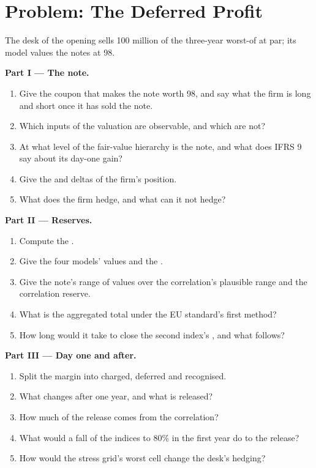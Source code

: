 \section{Problem: The Deferred Profit}

\begin{problem}\label{pb:dv:managing-an-exotic-book:1}
The desk of the opening sells 100 million of the three-year worst-of  at par; its model values the notes at 98.

\medskip\noindent\textbf{Part I --- The note.}
\begin{enumerate}
\item Give the coupon that makes the note worth 98, and say what the firm is long and short once it has sold the note.
\item Which inputs of the valuation are observable, and which are not?
\item At what level of the fair-value hierarchy is the note, and what does IFRS 9 say about its day-one gain?
\item Give the  and deltas of the firm's position.
\item What does the firm hedge, and what can it not hedge?
\end{enumerate}

\medskip\noindent\textbf{Part II --- Reserves.}
\begin{enumerate}[resume]
\item Compute the .
\item Give the four models' values and the .
\item Give the note's range of values over the correlation's plausible range and the correlation reserve.
\item What is the aggregated total under the EU standard's first method?
\item How long would it take to close the second index's , and what follows?
\end{enumerate}

\medskip\noindent\textbf{Part III --- Day one and after.}
\begin{enumerate}[resume]
\item Split the margin into charged, deferred and recognised.
\item What changes after one year, and what is released?
\item How much of the release comes from the correlation?
\item What would a fall of the indices to 80\% in the first year do to the release?
\item How would the stress grid's worst cell change the desk's hedging?
\end{enumerate}


\end{problem}
